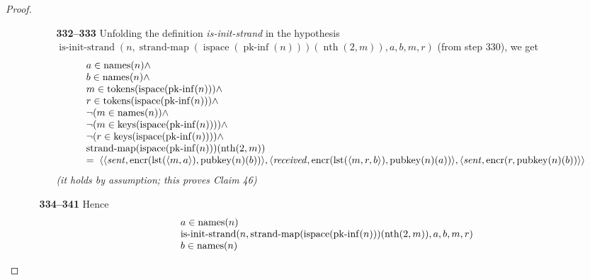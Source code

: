 \documentclass[11pt]{article}
\theoremstyle{plain}
\begin{document}
\begin{proof}
\begin{itemize}[leftmargin=2.8em, itemsep=4pt, parsep=1pt]
\begin{itemize}[leftmargin=2.8em, itemsep=4pt, parsep=1pt]
  \begin{itemize}[leftmargin=2.8em, itemsep=4pt, parsep=1pt]
  \item[\textbf{332--333}] Unfolding the definition \emph{is-init-strand} in the hypothesis $\operatorname{is\text{-}init\text{-}strand}(n, \operatorname{strand\text{-}map}(\operatorname{ispace}(\operatorname{pk\text{-}inf}(n)))(\operatorname{nth}(2, m)), a, b, m, r)$ (from step 330), we get
\begin{equation*}
\begin{array}{@{}l@{}} a \in \operatorname{names}(n) \wedge \\ b \in \operatorname{names}(n) \wedge \\ m \in \operatorname{tokens}(\operatorname{ispace}(\operatorname{pk\text{-}inf}(n))) \wedge \\ r \in \operatorname{tokens}(\operatorname{ispace}(\operatorname{pk\text{-}inf}(n))) \wedge \\ \neg (m \in \operatorname{names}(n)) \wedge \\ \neg (m \in \operatorname{keys}(\operatorname{ispace}(\operatorname{pk\text{-}inf}(n)))) \wedge \\ \neg (r \in \operatorname{keys}(\operatorname{ispace}(\operatorname{pk\text{-}inf}(n)))) \wedge \\ \operatorname{strand\text{-}map}(\operatorname{ispace}(\operatorname{pk\text{-}inf}(n)))(\operatorname{nth}(2, m)) \\ =\; \langle \langle \mathit{sent}, \operatorname{encr}(\operatorname{lst}(\langle m, a \rangle), \operatorname{pubkey}(n)(b)) \rangle, \langle \mathit{received}, \operatorname{encr}(\operatorname{lst}(\langle m, r, b \rangle), \operatorname{pubkey}(n)(a)) \rangle, \langle \mathit{sent}, \operatorname{encr}(r, \operatorname{pubkey}(n)(b)) \rangle \rangle \end{array}
\end{equation*}
  \emph{(it holds by assumption; this proves Claim 46)}
  \end{itemize}
  \item[\textbf{334--341}] Hence 
\begin{equation*}
\begin{array}{@{}l@{}}
a \in \operatorname{names}(n) \\
\operatorname{is\text{-}init\text{-}strand}(n, \operatorname{strand\text{-}map}(\operatorname{ispace}(\operatorname{pk\text{-}inf}(n)))(\operatorname{nth}(2, m)), a, b, m, r) \\
b \in \operatorname{names}(n) \\

\end{array}
\end{equation*}
\end{itemize}
\end{itemize}
\end{proof}
\end{document}
